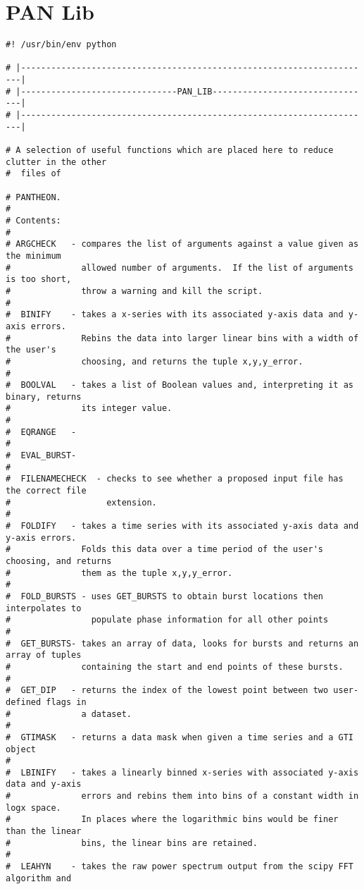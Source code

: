\section{PAN Lib}

\begin{verbatim}
#! /usr/bin/env python

# |----------------------------------------------------------------------|
# |-------------------------------PAN_LIB--------------------------------|
# |----------------------------------------------------------------------|

# A selection of useful functions which are placed here to reduce clutter in the other
#  files of

# PANTHEON.
#
# Contents:
#
# ARGCHECK   - compares the list of arguments against a value given as the minimum
#              allowed number of arguments.  If the list of arguments is too short,
#              throw a warning and kill the script.
#
#  BINIFY    - takes a x-series with its associated y-axis data and y-axis errors.
#              Rebins the data into larger linear bins with a width of the user's
#              choosing, and returns the tuple x,y,y_error.
#
#  BOOLVAL   - takes a list of Boolean values and, interpreting it as binary, returns 
#              its integer value.
#
#  EQRANGE   -
#
#  EVAL_BURST-
#
#  FILENAMECHECK  - checks to see whether a proposed input file has the correct file
#                   extension.
#
#  FOLDIFY   - takes a time series with its associated y-axis data and y-axis errors. 
#              Folds this data over a time period of the user's choosing, and returns
#              them as the tuple x,y,y_error.
#
#  FOLD_BURSTS - uses GET_BURSTS to obtain burst locations then interpolates to
#                populate phase information for all other points
#
#  GET_BURSTS- takes an array of data, looks for bursts and returns an array of tuples
#              containing the start and end points of these bursts.
#
#  GET_DIP   - returns the index of the lowest point between two user-defined flags in
#              a dataset.
#
#  GTIMASK   - returns a data mask when given a time series and a GTI object
#
#  LBINIFY   - takes a linearly binned x-series with associated y-axis data and y-axis
#              errors and rebins them into bins of a constant width in logx space.
#              In places where the logarithmic bins would be finer than the linear
#              bins, the linear bins are retained.
#
#  LEAHYN    - takes the raw power spectrum output from the scipy FFT algorithm and

\end{verbatim}
